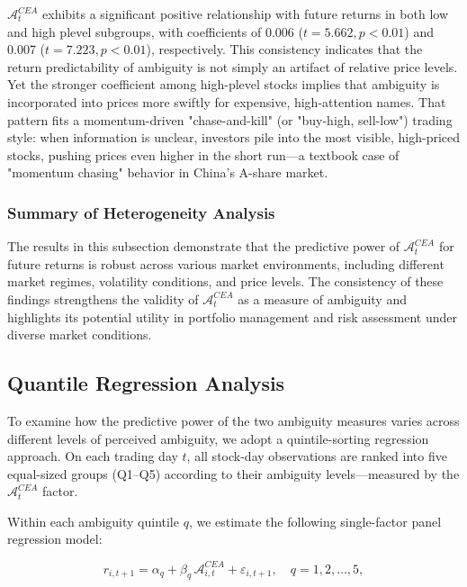 \documentclass[preprint,12pt,authoryear]{elsarticle}
\begin{document}
$\mathcal{A}^{CEA}_t$ exhibits a significant positive relationship with future returns in both low and high plevel subgroups, with coefficients of 0.006 ($t = 5.662, p < 0.01$) and 0.007 ($t = 7.223, p < 0.01$), respectively. This consistency indicates that the return predictability of ambiguity is not simply an artifact of relative price levels. Yet the stronger coefficient among high-plevel stocks implies that ambiguity is incorporated into prices more swiftly for expensive, high-attention names. That pattern fits a momentum-driven "chase-and-kill" (or "buy-high, sell-low") trading style: when information is unclear, investors pile into the most visible, high-priced stocks, pushing prices even higher in the short run—a textbook case of "momentum chasing" behavior in China's A-share market.

\subsubsection{Summary of Heterogeneity Analysis}

The results in this subsection demonstrate that the predictive power of $\mathcal{A}^{CEA}_t$ for future returns is robust across various market environments, including different market regimes, volatility conditions, and price levels. The consistency of these findings strengthens the validity of $\mathcal{A}^{CEA}_t$ as a measure of ambiguity and highlights its potential utility in portfolio management and risk assessment under diverse market conditions.




\subsection{ Quantile Regression Analysis}

To examine how the predictive power of the two ambiguity measures varies across different levels of perceived ambiguity, we adopt a quintile-sorting regression approach. On each trading day \( t \), all stock-day observations are ranked into five equal-sized groups (Q1–Q5) according to their ambiguity levels—measured by the \(\mathcal{A}^{CEA}_t\) factor.

Within each ambiguity quintile \( q \), we estimate the following single-factor panel regression model:

\begin{equation}
r_{i,t+1} = \alpha_q + \beta_q\,\mathcal{A}^{CEA}_{i,t} + \varepsilon_{i,t+1},
\quad q = 1,2,\ldots,5,
\end{equation}
\end{document}

